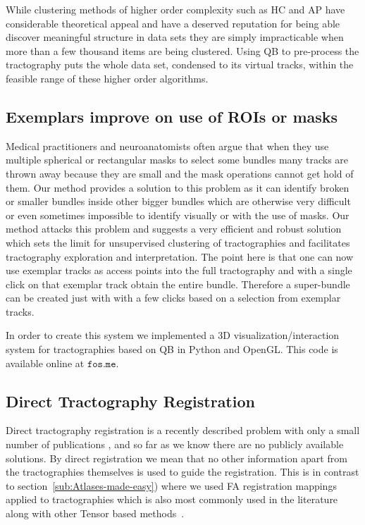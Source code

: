 \documentclass[journal]{IEEEtran}
\begin{document}
While clustering methods of higher order complexity such as HC and AP
have considerable theoretical appeal and have a deserved reputation for
being able discover meaningful structure in data sets they are simply
impracticable when more than a few thousand items are being
clustered. Using QB to pre-process the tractography puts the whole data
set, condensed to its virtual tracks, within the feasible range of these
higher order algorithms.

\subsection{Exemplars improve on use of ROIs or masks}

Medical practitioners and neuroanatomists often argue that when they use
multiple spherical or rectangular masks to select some bundles many
tracks are thrown away because they are small and the mask operations
cannot get hold of them. Our method provides a solution to this problem
as it can identify broken or smaller bundles inside other bigger bundles
which are otherwise very difficult or even sometimes impossible to
identify visually or with the use of masks. Our method attacks this
problem and suggests a very efficient and robust solution which sets the
limit for unsupervised clustering of tractographies and facilitates
tractography exploration and interpretation. The point here is that one
can now use exemplar tracks as access points into the full tractography
and with a single click on that exemplar track obtain the entire bundle.
Therefore a super-bundle can be created just with with a few clicks
based on a selection from exemplar tracks.

In order to create this system we implemented a 3D
visualization/interaction system for tractographies based on QB in
Python and OpenGL. This code is available online at $\texttt{fos.me}$.


\subsection{Direct Tractography Registration}

Direct tractography registration is a recently described problem with
only a small number of publications \cite{leemans2006multiscale,
  mayer2008bundles, mayerdirect, mayer2011supervised,
  durrleman2010registration, zvitia2008adaptive, Zvitia2010,
  ZiyanMICCAI07}, and so far as we know there are no publicly available
solutions. By direct registration we mean that no other information
apart from the tractographies themselves is used to guide the
registration. This is in contrast to
section~\ref{sub:Atlases-made-easy}) where we used FA registration
mappings applied to tractographies which is also most commonly used in
the literature along with other Tensor based
methods~\cite{goh2006algebraic}.
\end{document}
